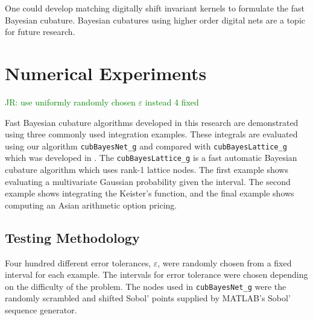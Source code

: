 \documentclass[graybox,footinfo]{svmult}
\newcommand{\code}[1]{\texttt{#1}}
\newcommand{\JRNote}[1]{{\textcolor{green}{JR: #1}}}
\begin{document}
One could develop matching digitally shift invariant kernels to formulate the fast Bayesian cubature. Bayesian cubatures using higher order digital nets are a topic for future research.
























\section{Numerical Experiments}

\label{sec:NumExp}

\JRNote{use uniformly randomly chosen $\varepsilon$ instead 4 fixed}

Fast Bayesian cubature algorithms developed in this research are demonstrated using three commonly used integration examples.
These integrals are evaluated using our algorithm \code{cubBayesNet\_g} and compared with \code{cubBayesLattice\_g} which was developed in \cite{RatHic19a}. The \code{cubBayesLattice\_g} is a fast automatic Bayesian cubature algorithm which uses rank-1 lattice nodes. The first example shows evaluating a multivariate Gaussian probability given the interval. The second example shows integrating the Keister's function, and the final example shows computing an Asian arithmetic option pricing.  


\subsection{Testing Methodology}
\label{sec:numerical_experiments_cubBayesLattice}

Four hundred different error tolerances, $\varepsilon$, were randomly chosen from a fixed interval  for each example. 
The intervals for error tolerance were chosen depending on the difficulty of the problem.
The nodes used in \code{cubBayesNet\_g} were the randomly scrambled and shifted Sobol' points supplied by MATLAB's Sobol' sequence generator. 
\end{document}
